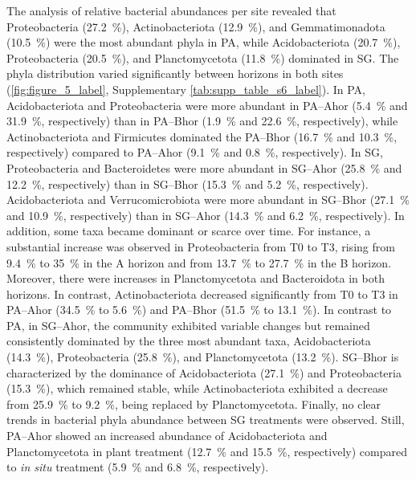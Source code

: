 The analysis of relative bacterial abundances per site revealed that Proteobacteria (\SI{27.2}{\percent}), Actinobacteriota (\SI{12.9}{\percent}), and Gemmatimonadota (\SI{10.5}{\percent}) were the most abundant phyla in PA, while Acidobacteriota (\SI{20.7}{\percent}), Proteobacteria (\SI{20.5}{\percent}), and Planctomycetota (\SI{11.8}{\percent}) dominated in SG. The phyla distribution varied significantly between horizons in both sites (\cref{fig:figure_5_label}, Supplementary \cref{tab:supp_table_s6_label}). In PA, Acidobacteriota and Proteobacteria were more abundant in PA--Ahor (\SI{5.4}{\percent} and \SI{31.9}{\percent}, respectively) than in PA--Bhor (\SI{1.9}{\percent} and \SI{22.6}{\percent}, respectively), while Actinobacteriota and Firmicutes dominated the PA--Bhor (\SI{16.7}{\percent} and \SI{10.3}{\percent}, respectively) compared to PA--Ahor (\SI{9.1}{\percent} and \SI{0.8}{\percent}, respectively). In SG, Proteobacteria and Bacteroidetes were more abundant in SG--Ahor (\SI{25.8}{\percent} and \SI{12.2}{\percent}, respectively) than in SG--Bhor (\SI{15.3}{\percent} and \SI{5.2}{\percent}, respectively). Acidobacteriota and Verrucomicrobiota were more abundant in SG--Bhor (\SI{27.1}{\percent} and \SI{10.9}{\percent}, respectively) than in SG--Ahor (\SI{14.3}{\percent} and \SI{6.2}{\percent}, respectively). In addition, some taxa became dominant or scarce over time. For instance, a substantial increase was observed in Proteobacteria from T0 to T3, rising from \SI{9.4}{\percent} to \SI{35}{\percent} in the A horizon and from \SI{13.7}{\percent} to \SI{27.7}{\percent} in the B horizon. Moreover, there were increases in Planctomycetota and Bacteroidota in both horizons. In contrast, Actinobacteriota decreased significantly from T0 to T3 in PA--Ahor (\SI{34.5}{\percent} to \SI{5.6}{\percent}) and PA--Bhor (\SI{51.5}{\percent} to \SI{13.1}{\percent}). In contrast to PA, in SG--Ahor, the community exhibited variable changes but remained consistently dominated by the three most abundant taxa, Acidobacteriota (\SI{14.3}{\percent}), Proteobacteria (\SI{25.8}{\percent}), and Planctomycetota (\SI{13.2}{\percent}). SG--Bhor is characterized by the dominance of Acidobacteriota (\SI{27.1}{\percent}) and Proteobacteria (\SI{15.3}{\percent}), which remained stable, while Actinobacteriota exhibited a decrease from \SI{25.9}{\percent} to \SI{9.2}{\percent}, being replaced by Planctomycetota. Finally, no clear trends in bacterial phyla abundance between SG treatments were observed. Still, PA--Ahor showed an increased abundance of Acidobacteriota and Planctomycetota in plant treatment (\SI{12.7}{\percent} and \SI{15.5}{\percent}, respectively) compared to \textit{in situ} treatment (\SI{5.9}{\percent} and \SI{6.8}{\percent}, respectively).

